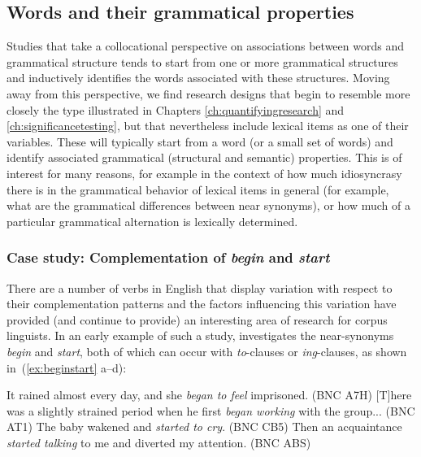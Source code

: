 \subsection{Words and their grammatical properties}
\label{sec:wordsandtheirgrammaticalproperties}

Studies that take a collocational perspective on associations between words and grammatical structure tends to start from one or more grammatical structures and inductively identifies the words associated with these structures. Moving away from this perspective, we find research designs that begin to resemble more closely the type illustrated in Chapters \ref{ch:quantifyingresearch} and \ref{ch:significancetesting}, but that nevertheless include lexical items as one of their variables. These will typically start from a word (or a small set of words) and identify associated grammatical (structural and semantic) properties. This is of interest for many reasons, for example in the context of how much idiosyncrasy there is in the grammatical behavior of lexical items in general (for example, what are the grammatical differences between near synonyms), or how much of a particular grammatical alternation is lexically determined.

\subsubsection{Case study: Complementation of \textit{begin} and \textit{start}}
\label{sec:complementationofbeginandstart}

There are a number of verbs in English that display variation with respect to their complementation patterns and the factors influencing this variation have provided (and continue to provide) an interesting area of research for corpus linguists. In an early example of such a study, \citet{schmid_introspection_1996} investigates the near-synonyms \textit{begin} and \textit{start}, both of which can occur with \textit{to}-clauses or \textit{ing}-clauses, as shown in (\ref{ex:beginstart} a--d):

\begin{exe}
\ex
\begin{xlist} 
\label{ex:beginstart}
\ex It rained almost every day, and she \textit{began to feel} imprisoned. (BNC A7H)
\ex $[$T$]$here was a slightly strained period when he first \textit{began working} with the group... (BNC AT1)
\ex The baby wakened and \textit{started to cry}. (BNC CB5)
\ex Then an acquaintance \textit{started talking} to me and diverted my attention. (BNC ABS)
\end{xlist}
\end{exe}


